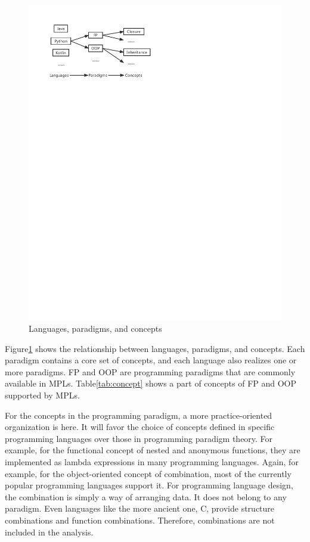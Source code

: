 \begin{figure}[htbp]
    \centerline{\includegraphics[scale=0.8]{figures/concept}}
    \caption{Languages, paradigms, and concepts}
    \label{fig:concept}
\end{figure}

Figure\ref{fig:concept} shows the relationship between languages,
paradigms, and concepts.
Each paradigm contains a core set of concepts,
and each language also realizes one or more paradigms.
FP and OOP are programming paradigms that are commonly
available in MPLs.
Table\ref{tab:concept} shows a part of concepts of FP and OOP
supported by MPLs.

For the concepts in the programming paradigm, a more practice-oriented organization is here. It will favor the choice of concepts defined in specific programming languages over those in programming paradigm theory. For example, for the functional concept of nested and anonymous functions, they are implemented as lambda expressions in many programming languages. Again, for example, for the object-oriented concept of combination, most of the currently popular programming languages support it. For programming language design, the combination is simply a way of arranging data. It does not belong to any paradigm. Even languages like the more ancient one, C, provide structure combinations and function combinations. Therefore, combinations are not included in the analysis.

